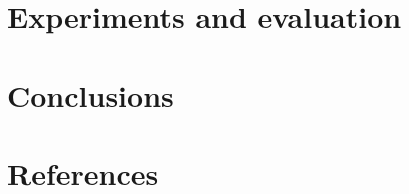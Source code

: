 \documentclass[10pt,twocolumn,letterpaper]{article}
\begin{document}
\section{Experiments and evaluation}

\section{Conclusions}

\section*{References}
\end{document}
